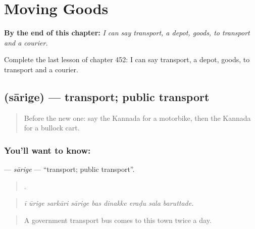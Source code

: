 
\chapter{Moving Goods}
\label{ch:ka-moving-goods}

\begin{chapteropening}
\textbf{By the end of this chapter:} \emph{I can say transport, a depot, goods, to transport and a courier.}

Complete the last lesson of chapter 452: I can say transport, a depot, goods, to transport and a courier.
\end{chapteropening}

\section[\texorpdfstring{\kn{ಸಾರಿಗೆ} (sārige)}{ಸಾರಿಗೆ (sārige)}]{ (sārige) — transport; public transport}

\label{lesson:KA-C452-sarige}



\begin{quote}
Before the new one: say the Kannada for a motorbike, then the Kannada for a bullock cart.
\end{quote}

\subsection*{You'll want to know: }
\textbf{} — \emph{sārige} — \textquotedblleft{}transport; public transport\textquotedblright{}.

\begin{quote}
        .
\end{quote}

\begin{quote}
\emph{ī ūrige sarkāri sārige bas dinakke eraḍu sala baruttade.}
\end{quote}

\begin{quote}
A government transport bus comes to this town twice a day.
\end{quote}

